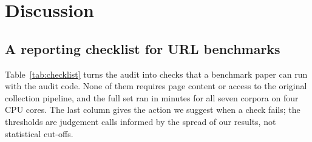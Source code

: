 \section{Discussion}
\label{sec:discussion}



\subsection{A reporting checklist for URL benchmarks}
Table~\ref{tab:checklist} turns the audit into checks that a benchmark paper can run with the audit code. None of them requires page content or access to the original collection pipeline, and the full set ran in \RunMinutes{} minutes for all seven corpora on four CPU cores. The last column gives the action we suggest when a check fails; the thresholds are judgement calls informed by the spread of our results, not statistical cut-offs.

